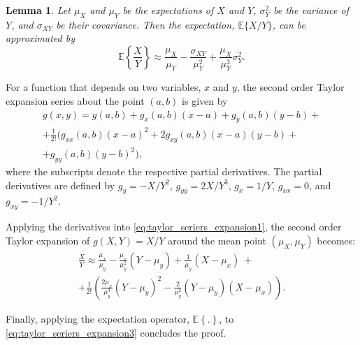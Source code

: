 \documentclass[10pt,journal,comsoc,final]{IEEEtran}
\newtheorem{lemma}{Lemma}
\begin{document}
\begin{lemma} Let $\mu_X$ and $\mu_Y$ be the expectations of $X$ and $Y$, $\sigma_{Y}^{2}$ be the variance of $Y$, and $\sigma_{XY}$ be their covariance. Then the expectation, $\mathbb{E} \{X/Y \}$, can be approximated by
\begin{equation}\label{eq:taylor_seriers_expansion}
\mathbb{E} \left\lbrace \frac{X}{Y} \right\rbrace \approx \frac{ \mu_{X} }{ \mu_{Y} } - \frac{\sigma_{XY}}{\mu_{Y}^{2}} + \frac{\mu_{X}}{\mu_{Y}^{3}} \sigma_{Y}^{2}.
\end{equation}
\end{lemma}
\begin{IEEEproof} For a function that depends on two variables, $x$ and $y$, the second order Taylor expansion series about the point $(a,b)$ is given by
\begin{equation}\label{eq:taylor_seriers_expansion1}
\begin{split}
g(x,y) = g(a,b)+g_{x}(a,b)(x-a) + g_{y}(a,b)(y-b) + \\ +\frac{1}{2!} ( g_{xx}(a,b)(x-a)^2 + 2g_{xy}(a,b)(x-a)(y-b) + \\ + g_{yy}(a,b)(y-b)^{2} ),
\end{split}
\end{equation}
where the subscripts denote the respective partial derivatives. The partial derivatives are defined by $g_{y} = -X/Y^2$, $g_{yy} = 2X/Y^3$, $g_{x} = 1/Y$, $g_{xx} = 0$, and $g_{xy} = - 1/Y^2$.

Applying the derivatives into \eqref{eq:taylor_seriers_expansion1}, the second order Taylor expansion of $g(X,Y) = X/Y$ around the mean point $(\mu_{X}, \mu_{Y})$ becomes:
\begin{equation}\label{eq:taylor_seriers_expansion3}
\begin{split}
\frac{X}{Y} \approx \frac{\mu_{x}}{\mu_{y}} - \frac{\mu_{x}}{\mu_{y}^2}(Y - \mu_{y}) + \frac{1}{\mu_{y}}(X - \mu_{x}) \ + \\ +\frac{1}{2!} \left( \frac{2\mu_{x}}{\mu_{y}^3}(Y - \mu_{y})^2 - \frac{2}{\mu_{y}^2}(Y - \mu_{y})(X - \mu_{x}) \right).
\end{split}
\end{equation}

Finally, applying the expectation operator, $\mathbb{E} \left\lbrace .\right\rbrace$, to \eqref{eq:taylor_seriers_expansion3} concludes the proof.
\end{IEEEproof}
\end{document}
